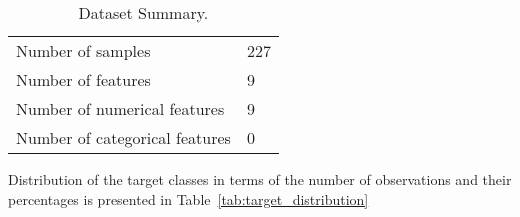 \documentclass{article}%
\begin{document}
\begin{table}[H]%
\begin{center}%
\renewcommand{\arraystretch}{1.5}%
\begin{tabular}{l l}%
\hline%
Number of samples&227\\%
Number of features&9\\%
Number of numerical features&9\\%
Number of categorical features&0\\%
\hline%
\end{tabular}%
\end{center}%
\caption{Dataset Summary.}%
\label{tab:dataset_summary}%
\end{table}

%
Distribution of the target classes in terms of the number of observations and their percentages is presented in %
Table~\ref{tab:target_distribution}%
\end{document}
